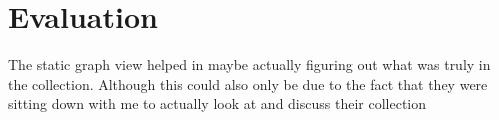 \chapter{Evaluation}
The static graph view helped in maybe actually figuring out what was truly in the collection. Although this could also only be due to the fact that they were sitting down with me to actually look at and discuss their collection